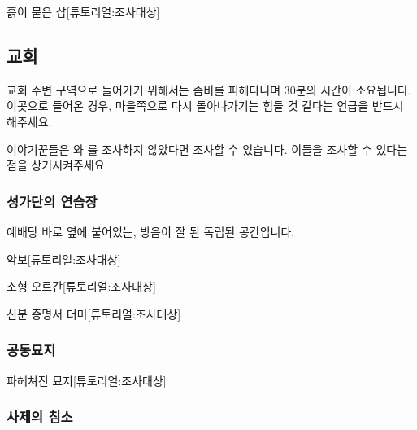 \documentclass{report}
\begin{document}
					\begin{spoiler}{흙이 묻은 삽}{[튜토리얼:조사대상]}
					\end{spoiler}
				
			\subsection{교회}
				교회 주변 구역으로 들어가기 위해서는 좀비를 피해다니며 30분의 시간이 소요됩니다. 이곳으로 들어온 경우, 마을쪽으로 다시 돌아나가기는 힘들 것 같다는 언급을 반드시 해주세요.
				
				이야기꾼들은 와 를 조사하지 않았다면 조사할 수 있습니다. 이들을 조사할 수 있다는 점을 상기시켜주세요.
				
				\hypertarget{search:choir-practice}{}
				\subsubsection*{성가단의 연습장}
					예배당 바로 옆에 붙어있는, 방음이 잘 된 독립된 공간입니다.
					
					\begin{spoiler}{악보}{[튜토리얼:조사대상]}
					\end{spoiler}
					
					\begin{spoiler}{소형 오르간}{[튜토리얼:조사대상]}
					\end{spoiler}
					
					\begin{spoiler}{신분 증명서 더미}{[튜토리얼:조사대상]}
					\end{spoiler}
				
				\hypertarget{search:graveyard}{}
				\subsubsection*{공동묘지}
					\begin{spoiler}{파헤쳐진 묘지}{[튜토리얼:조사대상]}
					\end{spoiler}
				
				\hypertarget{search:cleric-bedroom}{}
				\subsubsection*{사제의 침소}
					
\end{document}
